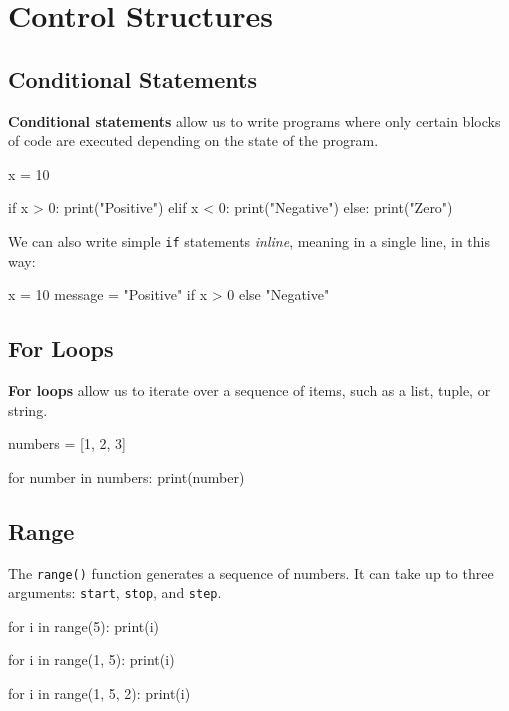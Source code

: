 \section{Control Structures}

\subsection*{Conditional Statements}

\textbf{Conditional statements} allow us to write programs where only certain blocks of code are executed depending on the state of the program. 
\begin{exampleblock}
\begin{codeblock}[language=python]
x = 10

if x > 0:
    print("Positive")
elif x < 0:
    print("Negative")
else:
    print("Zero")
\end{codeblock}
\end{exampleblock}

We can also write simple \texttt{if} statements \textit{inline}, meaning in a single line, in this way:
\begin{codeblock}[language=python]
x = 10
message = "Positive" if x > 0 else "Negative"
\end{codeblock}

\subsection*{For Loops}

\textbf{For loops} allow us to iterate over a sequence of items, such as a list, tuple, or string.
\begin{exampleblock}
\begin{codeblock}[language=python]
numbers = [1, 2, 3]

for number in numbers:
    print(number)
\end{codeblock}
\end{exampleblock}

\subsection*{Range}

The \texttt{range()} function generates a sequence of numbers. It can take up to three arguments: \texttt{start}, \texttt{stop}, and \texttt{step}.
\begin{exampleblock}
\begin{codeblock}[language=python]
for i in range(5):
    print(i)

for i in range(1, 5):
    print(i)

for i in range(1, 5, 2):
    print(i)
\end{codeblock}
\end{exampleblock}

